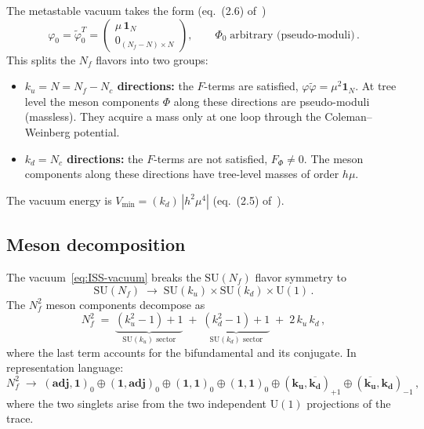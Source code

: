 \documentclass[11pt,a4paper]{article}
\newcommand{\Nf}{N_{\!f}}
\newcommand{\Nc}{N_{\!c}}
\newcommand{\rep}[1]{\mathbf{#1}}
\newcommand{\conjrep}[1]{\overline{\mathbf{#1}}}
\begin{document}
The metastable vacuum takes the form (eq.~(2.6) of~\cite{ISS2006})
\begin{equation}
  \varphi_0 = \tilde\varphi_0^T
  = \begin{pmatrix} \mu\,\mathbf{1}_N \\ 0_{(\Nf-N)\times N} \end{pmatrix},
  \qquad
  \Phi_0 \;\text{arbitrary (pseudo-moduli)}\,.
  \label{eq:ISS-vacuum}
\end{equation}
This splits the $\Nf$ flavors into two groups:
\begin{itemize}
\item \textbf{$k_u = N = \Nf - \Nc$ directions:} the $F$-terms are
  satisfied, $\varphi\tilde\varphi = \mu^2\mathbf{1}_N$.
  At tree level the meson components $\Phi$ along these directions
  are pseudo-moduli (massless).  They acquire a mass only at one loop
  through the Coleman--Weinberg potential.
\item \textbf{$k_d = \Nc$ directions:} the $F$-terms are not
  satisfied, $F_\Phi \ne 0$.  The meson components along these
  directions have tree-level masses of order $h\mu$.
\end{itemize}
The vacuum energy is $V_{\min} = (k_d)\,|h^2\mu^4|$
(eq.~(2.5) of~\cite{ISS2006}).

\subsection{Meson decomposition}

The vacuum~\eqref{eq:ISS-vacuum} breaks the $\mathrm{SU}(\Nf)$
flavor symmetry to
\begin{equation}
  \mathrm{SU}(\Nf) \;\longrightarrow\;
  \mathrm{SU}(k_u) \times \mathrm{SU}(k_d)
  \times \mathrm{U}(1)\,.
  \label{eq:breaking-pattern}
\end{equation}
The $\Nf^2$ meson components decompose as
\begin{equation}
  \Nf^2 \;=\;
  \underbrace{(k_u^2-1)+1}_{\mathrm{SU}(k_u)\text{ sector}}
  \;+\;
  \underbrace{(k_d^2-1)+1}_{\mathrm{SU}(k_d)\text{ sector}}
  \;+\;
  2\,k_u\, k_d\,,
  \label{eq:meson-counting}
\end{equation}
where the last term accounts for the bifundamental and its conjugate.
In representation language:
\begin{equation}
  \Nf^2 \;\to\;
  (\rep{adj},\rep{1})_0
  \oplus (\rep{1},\rep{adj})_0
  \oplus (\rep{1},\rep{1})_0
  \oplus (\rep{1},\rep{1})_0
  \oplus (\rep{k_u},\conjrep{k_d})_{+1}
  \oplus (\conjrep{k_u},\rep{k_d})_{-1}\,,
  \label{eq:branching}
\end{equation}
where the two singlets arise from the two independent
$\mathrm{U}(1)$ projections of the trace.
\end{document}
